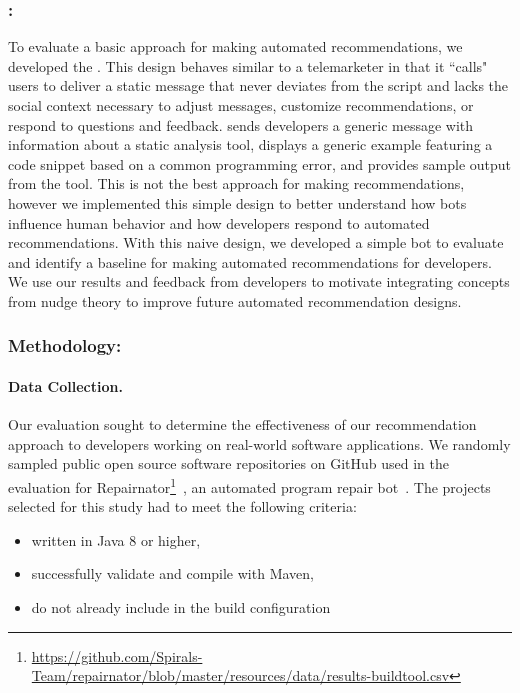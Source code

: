 \subsubsection{\tele:}

To evaluate a basic approach for making automated recommendations, we developed the \tele. This design behaves similar to a telemarketer in that it ``calls" users to deliver a static message that never deviates from the script and lacks the social context necessary to adjust messages, customize recommendations, or respond to questions and feedback. \tele sends developers a generic message with information about a static analysis tool, displays a generic example featuring a code snippet based on a common programming error, and provides sample output from the tool. This is not the best approach for making recommendations, however we implemented this simple design to better understand how bots influence human behavior and how developers respond to automated recommendations. With this naive design, we developed a simple bot to evaluate and identify a baseline for making automated recommendations for developers. We use our results and feedback from developers to motivate integrating concepts from nudge theory to improve future automated recommendation designs. 

\subsubsection{Methodology:}

\paragraph{Data Collection.}

Our evaluation sought to determine the effectiveness of our \tele recommendation approach to developers working on real-world software applications. We randomly sampled public open source software repositories on GitHub used in the evaluation for Repairnator\footnote{\url{https://github.com/Spirals-Team/repairnator/blob/master/resources/data/results-buildtool.csv}}~\cite{Repairnator}, an automated program repair bot~\cite{Repairnator}. The projects selected for this study had to meet the following criteria:

\begin{itemize}
    \item written in Java 8 or higher,
    \item successfully validate and compile with Maven,
    \item do not already include \EP in the build configuration
\end{itemize}

